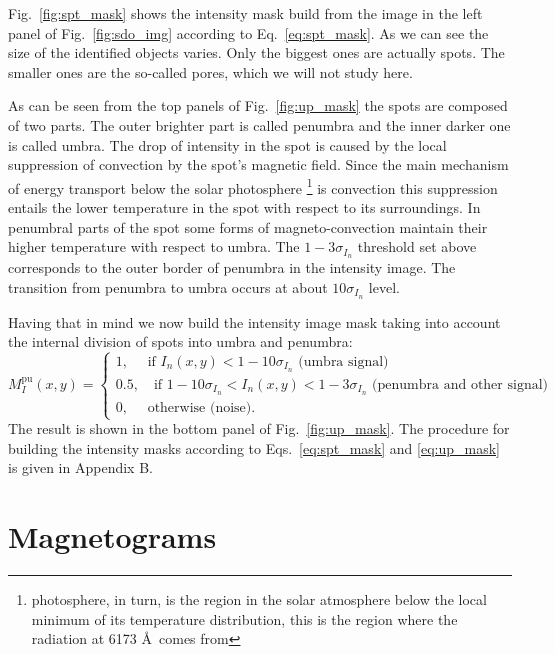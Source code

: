 \documentclass[paper=a4, fontsize=11pt]{article}
\numberwithin{equation}{section}
\numberwithin{figure}{section}
\numberwithin{table}{section}
\begin{document}
Fig.~\ref{fig:spt_mask} shows the intensity mask build from the image in the left panel of Fig.~\ref{fig:sdo_img}
according to Eq.~\eqref{eq:spt_mask}.
As we can see the size of the identified objects varies.
Only the biggest ones are actually spots.
The smaller ones are the so-called pores, which we will not study here.

As can be seen from the top panels of Fig.~\ref{fig:up_mask} the spots are composed of two parts.
The outer brighter part is called penumbra and the inner darker one is called umbra.
The drop of intensity in the spot is caused by the local suppression of convection by the spot's magnetic field.
Since the main mechanism of energy transport below the solar photosphere
\footnote{photosphere, in turn, is the region in the solar atmosphere below the local minimum of its temperature distribution,
this is the region where the radiation at 6173 \AA\ comes from}
is convection this suppression entails the lower temperature in the spot with respect to its surroundings.
In penumbral parts of the spot some forms of magneto-convection maintain their higher temperature with respect to umbra.
The $1 - 3\sigma_{I_n}$ threshold set above corresponds to the outer border of penumbra in the intensity image.
The transition from penumbra to umbra occurs at about $10\sigma_{I_n}$ level.

Having that in mind we now build the intensity image mask taking into account the internal division of spots into
umbra and penumbra:
\begin{equation}\label{eq:up_mask}
M_I^\mathrm{pu}(x, y) =
\begin{cases}
1,  \quad\text{      \ if \ \ \ \ \ \ \ \ \ \ \ \ \ \ \ \ \ }                      I_n(x, y) < 1 - 10\sigma_{I_n}\text{ (umbra signal)}\\
0.5,\quad \text{if } 1 - 10\sigma_{I_n} < I_n(x, y) < 1 - 3\sigma_{I_n}\text{ (penumbra and other signal)}\\
0,  \quad \text{     \ otherwise (noise)}.
\end{cases} 
\end{equation}
The result is shown in the bottom panel of Fig.~\ref{fig:up_mask}.
The procedure for building the intensity masks according to Eqs.~\eqref{eq:spt_mask} and \eqref{eq:up_mask} is given in Appendix B.

\section{Magnetograms}
\end{document}

